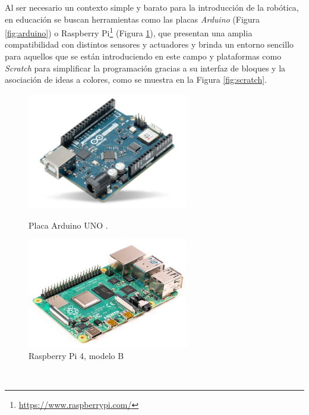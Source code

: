 Al ser necesario un contexto simple y barato para la introducción de la
robótica, en educación se buscan herramientas como las placas \textit{Arduino}
(Figura \ref{fig:arduino}) o Raspberry Pi\footnote{
\href{https://www.raspberrypi.com/}{https://www.raspberrypi.com/}} (Figura
\ref{fig:raspberry_pi}), que presentan una amplia compatibilidad con distintos
sensores y actuadores y brinda un entorno sencillo para aquellos que se están
introduciendo en este campo y plataformas como \textit{Scratch} para simplificar
la programación gracias a su interfaz de bloques y la asociación de ideas a
colores, como se muestra en la Figura \ref{fig:scratch}.

\begin{figure}[h!]
  \centering
  \begin{minipage}{0.45\textwidth}
    \centering
    \includegraphics[width=7cm]{figs/arduino}
    \caption{Placa Arduino UNO \cite{arduino_uno}.}
    \label{fig:arduino}
  \end{minipage}
  \hfill
  \begin{minipage}{0.45\textwidth}
    \centering
    \includegraphics[width=7cm]{figs/raspberry_pi_4b}
    \caption{Raspberry Pi 4, modelo B \cite{raspberry_pi_4b}}
    \label{fig:raspberry_pi}
  \end{minipage}
\end{figure}\

